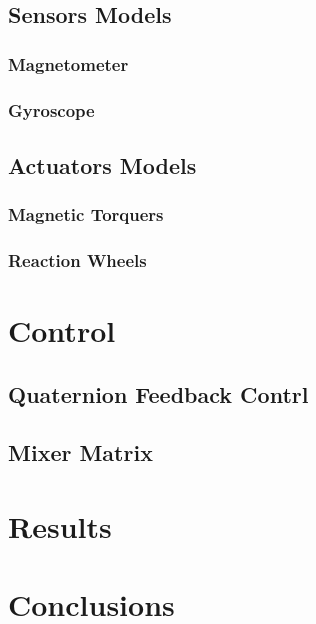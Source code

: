 \documentclass[11pt,a4paper]{report}
\begin{document}
\section{Sensors Models}
\subsection{Magnetometer}
\subsection{Gyroscope}
\section{Actuators Models}
\subsection{Magnetic Torquers}
\subsection{Reaction Wheels}

\chapter{Control}
\section{Quaternion Feedback Contrl}
\section{Mixer Matrix}

\chapter{Results}

\chapter{Conclusions}

\newpage
\end{document}
